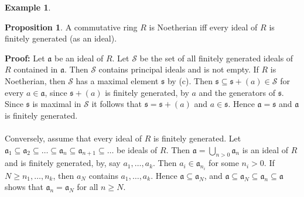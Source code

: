 \documentclass[11pt]{amsbook}%
\theoremstyle{plain}
\theoremstyle{definition}
\newtheorem*{example*}{Example}
\newtheorem{proposition}[theorem]{Proposition}
\numberwithin{equation}{section}
\newcommand{\SC}{\mathcal S}
\newcommand{\af}{\mathfrak a}
\newcommand{\sff}{\mathfrak s}
\renewcommand{\proof}{ \textbf{Proof: }}
\begin{document}
\begin{example*}
\begin{proposition}
  A commutative ring $R$ is Noetherian iff every ideal of $R$ is finitely generated (as an ideal).
\end{proposition} \vspace{1.8em}
\proof Let $\af$ be an ideal of $R$. Let $\SC$ be the set of all finitely generated ideals of $R$
contained in $\af$. Then $\SC$ contains principal ideals and is not empty. If $R$ is Noetherian, then $\SC$
has a maximal element $\sff$ by (c). Then $\sff \subseteq \sff + (a) \in \SC$ for every $a \in \af$,
since $\sff + (a)$ is finitely generated, by $a$ and the generators of $\sff$. Since $\sff$ is maximal
in $\SC$ it follows that $\sff = \sff + (a)$ and $a \in \sff$. Hence $\af = \sff$ and $\af$ is finitely generated. \\ \\
Conversely, assume that every ideal of $R$ is finitely generated. Let $\af_{1} \subseteq \af_{2} \subseteq \dots \subseteq \af_{n} \subseteq \af_{n+1} \subseteq \dots$ be ideals of $R$. Then $\af = \bigcup_{n>0} \af_{n}$ is an ideal of $R$ and is finitely generated, by, say $a_{1}, \dots, a_{k}$. Then $a_{i} \in \af_{n_{i}}$
for some $n_{i} > 0$. If $N \geq n_{1}, \dots, n_{k}$, then $a_{N}$ contains $a_{1}, \dots, a_{k}$. Hence $\af \subseteq \af_{N}$, and
$\af \subseteq \af_{N} \subseteq \af_{n} \subseteq \af$ shows that $\af_{n} = \af_{N}$ for all $n \geq N$. \qedsymbol


\end{example*}
\end{document}

